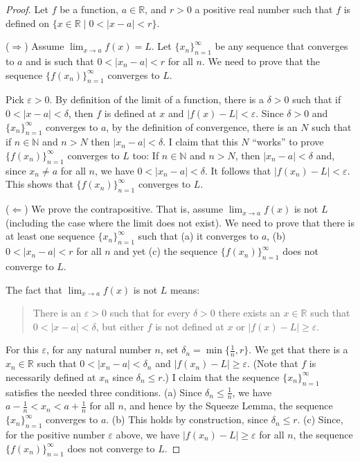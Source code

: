 \documentclass[12pt]{amsart}
\def\d{\delta}
\def\e{\varepsilon}
\newcommand{\R}{{\mathbb{R}}}
\newcommand{\N}{\mathbb{N}}
\numberwithin{equation}{section}
\theoremstyle{plain} %
\theoremstyle{definition}
\theoremstyle{remark}
\begin{document}
\begin{proof}Let $f$ be a function, $a \in \R$, and $r > 0$ a
  positive real number such that $f$ is    defined on $\{x \in \R \mid 0 < |x-a| < r \}$. 

  ($\Rightarrow$) Assume 
$\lim_{x \to a} f(x) = L$. Let 
$\{x_n\}_{n=1}^\infty$ be any sequence that converges to $a$ and is such that $0 < |x_n-a| < r$ for all $n$.
We need to prove that the sequence $\{f(x_n)\}_{n=1}^\infty$ converges to $L$. 

Pick $\e > 0$. By definition of the limit of a function, there is a $\d > 0$ such that if
$0 < |x-a| < \d$, then $f$ is defined at $x$ and ${|f(x) - L| < \e}$.
Since $\d > 0$ and $\{x_n\}_{n=1}^\infty$ converges to $a$, by the definition of convergence, there is an $N$ such that if
$n \in \N$ and $n > N$ then $|x_n - a| < \d$. 
I claim that this $N$ ``works'' to prove $\{f(x_n)\}_{n=1}^\infty$ converges to $L$ too:
If $n \in \N$ and $n > N$, then $|x_n - a| < \d$ and, since $x_n \ne a$ for all $n$, we have  
$0 < |x_n - a| < \d$. It follows that $|f(x_n) - L| < \e$. This shows that $\{f(x_n)\}_{n=1}^\infty$ converges to $L$. 


($\Leftarrow$) We prove the contrapositive. That is, assume 
$\lim_{x \to a} f(x)$ is not $L$ (including the case where the limit does not exist).  We need to prove that
there is at least one sequence 
$\{x_n\}_{n=1}^\infty$ such that (a) it converges to $a$, (b)  $0 < |x_n -a| < r$ for all $n$ and yet
(c) the sequence $\{f(x_n)\}_{n=1}^\infty$ does not converge to $L$. 

The fact that $\lim_{x \to a} f(x)$ is not $L$ means:
\begin{quote}
  There is an $\e > 0$ such that for every $\d > 0$ there exists an $x \in \R$ such that
$0 < |x- a| < \d$, but   either $f$ is not  defined at $x$  or $|f(x) -L| \geq \e$.
\end{quote}
For this $\e$, for any natural number $n$, set $\d_n = \min\{\frac{1}{n}, r\}$. We get that there is a $x_n \in \R$ such
that $0 < |x_n-a| < \d_n$ and $|f(x_n) - L| \geq \e$. (Note that $f$ is necessarily defined at $x_n$ since $\d_n \leq r$.)
I claim that the sequence $\{x_n\}_{n=1}^\infty$ satisfies the needed three conditions. 
(a) Since $\delta_n \leq \frac{1}{n}$, we have $a - \frac{1}{n} < x_n < a + \frac{1}{n}$ for all $n$, and hence by the Squeeze Lemma,
the sequence $\{x_n\}_{n=1}^\infty$ converges to $a$. (b) This holds by construction, since $\d_n \leq r$. 
(c) Since, for the positive number $\e$ above, we have $|f(x_n) -L| \geq \e$ for all $n$, the sequence $\{f(x_n)\}_{n=1}^\infty$ does not converge to $L$. 
\end{proof}
\end{document}
